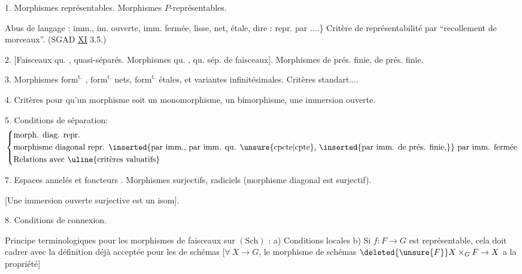 1. Morphismes représentables. Morphismes $P$-représentables.

Abus de langage : imm., im. ouverte, imm. fermée, lisse, net, étale,  dire : repr. par ....\} Critère de représentabilité par ``recollement de morceaux''. (SGAD \uline{XI} 3.5.)

2. [Faisceaux qu. , quasi-séparés. Morphismes qu. , qu. sép. de faisceaux]. Morphismes  de prés. finie, de prés. finie. 

3. Morphismes $\mathrm{form}^{\mathrm{t.}}$ , $\mathrm{form}^{\mathrm{t.}}$ nets, $\mathrm{form}^{\mathrm{t.}}$ étales, et variantes infinitésimales. Critères standart....

4. Critères pour qu'un morphisme soit un monomorphisme, un bimorphisme, une immersion ouverte.

5. Conditions de séparation:
\[
\left\{\begin{aligned}
&\text{morph. diag. repr.}\\
&\text{morphisme diagonal repr. \inserted{par imm., par imm. qu. \unsure{cpcte|cpte}, \inserted{par imm. de prés. finie,}} par imm. fermée}\\
&\text{Relations avec \uline{critères valuatifs}}
\end{aligned}\right.
\]


7. Espaces annelés et foncteurs  . Morphismes surjectifs,  radiciels (morphisme diagonal est surjectif).

[Une immersion ouverte surjective est un isom].

8. Conditions de connexion.

Principe terminologiques pour les morphismes de faisceaux sur $(\mathrm{Sch})$ : a) Conditions locales b) Si $f:F\to G$ est représentable, cela doit cadrer avec la définition déjà acceptée pour  les  de schémas [$\forall\ X\to G$, le morphisme de schémas $\deleted{\unsure{F}}X\times_G F\to X$ a la propriété]

